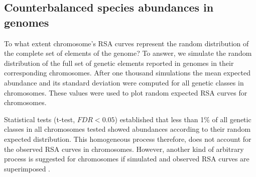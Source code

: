\subsection{Counterbalanced species abundances in genomes}

To what extent chromosome's RSA curves represent the random distribution of the complete set of elements of the genome? To answer, we simulate the random distribution of the full set of genetic elements reported in genomes in their corresponding chromosomes. After one thousand simulations the mean expected abundance and its standard deviation were computed for all genetic classes in chromosomes. These values were used to plot random expected RSA curves for chromosomes.

Statistical tests (t-test, $FDR<0.05$) established that less than 1\% of all genetic classes in all chromosomes tested showed abundances according to their random expected distribution. This homogeneous process therefore, does not account for the observed RSA curves in chromosomes. However, another kind of arbitrary process is suggested for chromosomes if simulated and observed RSA curves are superimposed .

